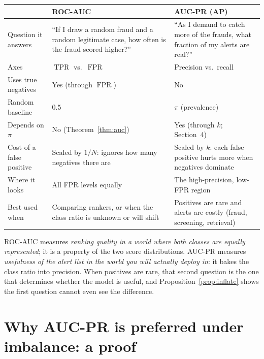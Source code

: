\documentclass[11pt,a4paper]{article}
\DeclareMathOperator{\TPR}{TPR}
\DeclareMathOperator{\FPR}{FPR}
\theoremstyle{plain}
\theoremstyle{definition}
\theoremstyle{remark}
\begin{document}
\begin{center}
\small
\renewcommand{\arraystretch}{1.25}
\begin{tabular}{@{}p{3.1cm}p{5.7cm}p{5.7cm}@{}}
\toprule
 & \textbf{ROC-AUC} & \textbf{AUC-PR (AP)} \\
\midrule
Question it answers &
``If I draw a random fraud and a random legitimate case, how often is the fraud scored higher?'' &
``As I demand to catch more of the frauds, what fraction of my alerts are real?'' \\
Axes & $\TPR$ vs.\ $\FPR$ & Precision vs.\ recall \\
Uses true negatives & Yes (through $\FPR$) & No \\
Random baseline & $0.5$ & $\pi$ (prevalence) \\
Depends on $\pi$ & No (Theorem~\ref{thm:auc}) & Yes (through $k$; Section~4) \\
Cost of a false positive & Scaled by $1/N$: ignores how many negatives there are & Scaled by $k$: each false positive hurts more when negatives dominate \\
Where it looks & All FPR levels equally & The high-precision, low-FPR region \\
Best used when & Comparing rankers, or when the class ratio is unknown or will shift & Positives are rare and alerts are costly (fraud, screening, retrieval) \\
\bottomrule
\end{tabular}
\end{center}

\begin{insight}
ROC-AUC measures \emph{ranking quality in a world where both classes are equally represented}; it is a
property of the two score distributions. AUC-PR measures \emph{usefulness of the alert list in the
world you will actually deploy in}: it bakes the class ratio into precision. When positives are rare,
that second question is the one that determines whether the model is useful, and
Proposition~\ref{prop:inflate} shows the first question cannot even see the difference.
\end{insight}

\section{Why AUC-PR is preferred under imbalance: a proof}
\end{document}
